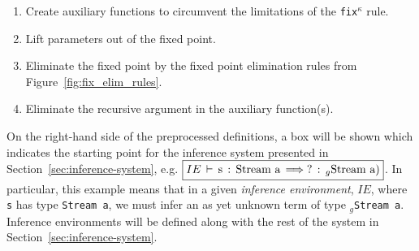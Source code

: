 
\begin{enumerate}
\item Create auxiliary functions to circumvent the limitations of the
  \texttt{fix$^\kappa$} rule.
\item Lift parameters out of the fixed point.
\item Eliminate the fixed point by the fixed point elimination rules from
  Figure~\ref{fig:fix_elim_rules}.
\item Eliminate the recursive argument in the auxiliary function(s).
\end{enumerate}

\newcommand{\prepend}[5]{\ensuremath{{\boxed{IE\,\vdash\,\text{#4}\,:\,\text{#5}\,\infer
        \text{?}\,:\,_{g}\text{#5})}}}}
\newcommand{\prependm}[5]{\ensuremath{{\boxed{
            \begin{matrix*}[l] IE\,\vdash \\
                           \quad\text{#4}\,:\,\text{#5}\,\infer\,\text{?}\,:\,_{g}\text{#5})
            \end{matrix*}
            }}}}
\newcommand{\changed}[1]{\ensuremath{\fcolorbox{gray}{light-gray}{a rec}}}

On the right-hand side of the preprocessed definitions, a box will be shown
which indicates the starting point for the inference system presented in
Section~\ref{sec:inference-system},
e.g. \prepend{\text{prepend}}{\text{prepend}}{\,_{g}\text{prepend}}{s}{Stream
  a}. In particular, this example means that in a given \emph{inference
  environment}, $IE$, where \texttt{s} has type \texttt{Stream a}, we must infer
an as yet unknown term of type \texttt{$_g$Stream a}. Inference environments will
be defined along with the rest of the system in
Section~\ref{sec:inference-system}. 

